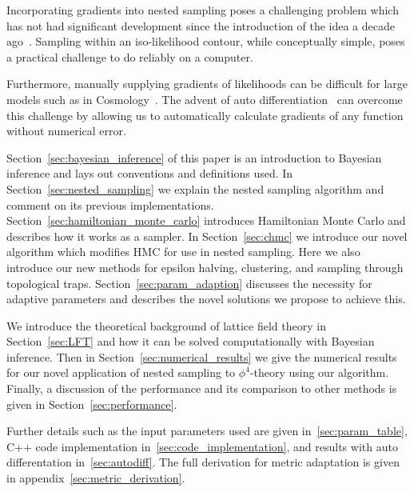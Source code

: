 \documentclass[11pt]{article}
\begin{document}
    Incorporating gradients into nested sampling poses a challenging problem which has not had significant development
    since the introduction of the idea a decade ago~\cite{Betancourt_NS_CHMC, GMC}.
    Sampling within an iso-likelihood contour, while conceptually simple, poses a practical challenge to do reliably on
    a computer.

    Furthermore, manually supplying gradients of likelihoods can be difficult for large models such as in
    Cosmology~\cite{plank2018, Handley_2015, mukherjee2006nested}.
    The advent of auto differentiation~\cite{NEURIPS2020_9332c513, 10.1145/3458817.3476165, 10.5555/3571885.3571964}
    can overcome this challenge by allowing us to automatically calculate gradients of any function without
    numerical error.

    Section~\ref{sec:bayesian_inference} of this paper is an introduction to Bayesian inference and lays out conventions
    and definitions used.
    In Section~\ref{sec:nested_sampling} we explain the nested sampling algorithm and comment on its
    previous implementations.
    Section~\ref{sec:hamiltonian_monte_carlo} introduces Hamiltonian Monte Carlo and describes how it works as a sampler.
    In Section~\ref{sec:chmc} we introduce our novel algorithm which modifies HMC for use in nested sampling.
    Here we also introduce our new methods for epsilon halving, clustering, and sampling through topological traps.
    Section~\ref{sec:param_adaption} discusses the necessity for adaptive parameters and describes
    the novel solutions we propose to achieve this.

    We introduce the theoretical background of lattice field theory in Section~\ref{sec:LFT} and how it can be
    solved computationally with Bayesian inference.
    Then in Section~\ref{sec:numerical_results} we give the numerical results for our novel application of nested
    sampling to $\phi^4$-theory using our algorithm.
    Finally, a discussion of the performance and its comparison to other methods is given in Section~\ref{sec:performance}.

    Further details such as the input parameters used are given in~\cref{sec:param_table},
    C++ code implementation in~\cref{sec:code_implementation}, and results with auto differentation in~\cref{sec:autodiff}.
    The full derivation for metric adaptation is given in appendix~\ref{sec:metric_derivation}.
\end{document}
